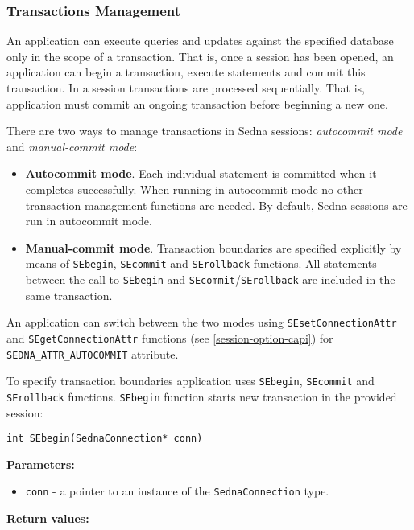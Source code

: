 \documentclass[a4paper,12pt]{article}
\newenvironment{citemize}
{\begin{itemize}
  \setlength{\itemsep}{0pt}
  \setlength{\parskip}{0pt}
  \setlength{\parsep}{0pt}}
{\end{itemize}}
\begin{document}
\subsubsection{Transactions Management}
An application can execute queries and updates against the specified database
only in the scope of a transaction. That is, once a session has been opened, an
application can begin a transaction, execute statements and commit this
transaction. In a session transactions are processed sequentially. That is,
application must commit an ongoing transaction before beginning a new one.

There are two ways to manage transactions in Sedna sessions: \emph{autocommit
mode} and \emph{manual-commit mode}:

\begin{itemize}
\item\textbf{Autocommit mode}. Each individual statement is committed when it
completes successfully. When running in autocommit mode no other transaction
management functions are needed. By default, Sedna sessions are run in
autocommit mode.
\item\textbf{Manual-commit mode}. Transaction boundaries are specified
explicitly by means of \verb!SEbegin!, \verb!SEcommit! and \verb!SErollback!
functions. All statements between the call to \verb!SEbegin! and
\verb!SEcommit!/\verb!SErollback! are included in the same transaction.
\end{itemize}

An application can switch between the two modes using \verb!SEsetConnectionAttr!
and \verb!SEgetConnectionAttr! functions (see \ref{session-option-capi}) for
\verb!SEDNA_ATTR_AUTOCOMMIT! attribute.

To specify transaction boundaries application uses \verb!SEbegin!,
\verb!SEcommit! and \verb!SErollback! functions. \verb!SEbegin! function starts
new transaction in the provided session:

\begin{verbatim}
int SEbegin(SednaConnection* conn)
\end{verbatim}

\noindent
\textbf{Parameters:}

\begin{citemize}
\item\verb!conn! - a pointer to an instance of the \verb!SednaConnection! type.
\end{citemize}

\noindent
\textbf{Return values:}
\end{document}
